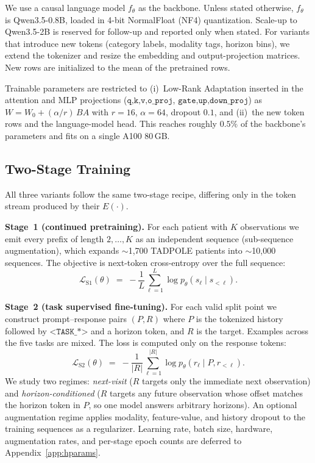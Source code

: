 \documentclass{article}
\newcommand{\ttoken}[1]{\texttt{<#1>}}
\begin{document}
We use a causal language model $f_\theta$ as the backbone.
Unless stated otherwise, $f_\theta$ is Qwen3.5-0.8B, loaded in 4-bit NormalFloat (NF4) quantization. Scale-up to Qwen3.5-2B is reserved for follow-up and reported only when stated.
For variants that introduce new tokens (category labels, modality tags, horizon bins), we extend the tokenizer and resize the embedding and output-projection matrices. New rows are initialized to the mean of the pretrained rows.

Trainable parameters are restricted to (i)~Low-Rank Adaptation \citep{hu2022lora} inserted in the attention and MLP projections ($\texttt{q,k,v,o\_proj}$, $\texttt{gate,up,down\_proj}$) as $W = W_0 + (\alpha/r)\, B A$ with $r=16$, $\alpha=64$, dropout $0.1$, and (ii)~the new token rows and the language-model head.
This reaches roughly $0.5\%$ of the backbone's parameters and fits on a single A100 80\,GB.

\subsection{Two-Stage Training}
\label{sec:training}

All three variants follow the same two-stage recipe, differing only in the token stream produced by their $E(\cdot)$.

\textbf{Stage~1 (continued pretraining).}
For each patient with $K$ observations we emit every prefix of length $2,\ldots,K$ as an independent sequence (sub-sequence augmentation), which expands $\sim$1{,}700 TADPOLE patients into $\sim$10{,}000 sequences.
The objective is next-token cross-entropy over the full sequence:
\begin{equation}
    \mathcal{L}_{\text{S1}}(\theta)
    \;=\; -\frac{1}{L} \sum_{\ell=1}^{L} \log p_\theta(s_\ell \mid s_{<\ell}).
    \label{eq:loss_s1}
\end{equation}

\textbf{Stage~2 (task supervised fine-tuning).}
For each valid split point we construct prompt--response pairs $(P, R)$ where $P$ is the tokenized history followed by $\ttoken{TASK\_*}$ and a horizon token, and $R$ is the target.
Examples across the five tasks are mixed.
The loss is computed only on the response tokens:
\begin{equation}
    \mathcal{L}_{\text{S2}}(\theta)
    \;=\; -\frac{1}{|R|} \sum_{\ell=1}^{|R|} \log p_\theta(r_\ell \mid P, r_{<\ell}).
    \label{eq:loss_s2}
\end{equation}
We study two regimes: \emph{next-visit} ($R$ targets only the immediate next observation) and \emph{horizon-conditioned} ($R$ targets any future observation whose offset matches the horizon token in $P$, so one model answers arbitrary horizons).
An optional augmentation regime applies modality, feature-value, and history dropout to the training sequences as a regularizer. Learning rate, batch size, hardware, augmentation rates, and per-stage epoch counts are deferred to Appendix~\ref{app:hparams}.
\end{document}
